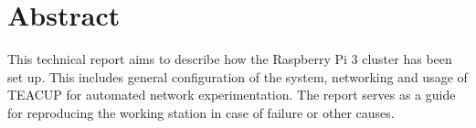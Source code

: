 \chapter*{Abstract}

This technical report aims to describe how the Raspberry Pi 3 cluster has been set up. This includes general configuration of the system, networking and usage of TEACUP for automated network experimentation. The report serves as a guide for reproducing the working station in case of failure or other causes.